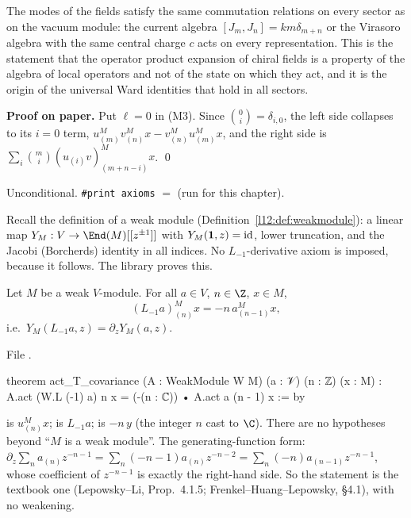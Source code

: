 \begin{physics}
The modes of the fields satisfy the same commutation relations on every sector as on the vacuum module: the
current algebra $[J_m,J_n] = km\delta_{m+n}$ or the Virasoro algebra with the same central charge $c$ acts on every
representation. This is the statement that the operator product expansion of chiral fields is a property of the algebra
of local operators and not of the state on which they act, and it is the origin of the universal Ward identities that
hold in all sectors.
\end{physics}

\textbf{Proof on paper.} Put $\ell = 0$ in (M3). Since $\binom0i = \delta_{i,0}$, the left side collapses to its $i=0$ term,
$u^M_{(m)}v^M_{(n)}x - v^M_{(n)}u^M_{(m)}x$, and the right side is $\sum_{i}\binom mi(u_{(i)}v)^M_{(m+n-i)}x$. \qed

\begin{status}
Unconditional. \texttt{\#print axioms}  $=$
\lean{[propext, Classical.}\allowbreak{}\allowbreak\lean{sound]} (run for this chapter).
\end{status}

Recall the definition of a weak module (Definition~\ref{l12:def:weakmodule}): a linear map
$Y_M:V\to\End(M)[[z^{\pm1}]]$ with $Y_M(\mathbf{1},z) = \mathrm{id}$, lower truncation, and the Jacobi
(Borcherds) identity in all indices. No $L_{-1}$-derivative axiom is imposed, because it follows. The
library proves this.

\begin{theorem}\label{l12:thm:covariance}
Let $M$ be a weak $V$-module. For all $a\in V$, $n\in\Z$, $x\in M$,
\begin{equation*}
 (L_{-1}a)^M_{(n)}x = -n\, a^M_{(n-1)}x ,
\end{equation*}
i.e.\ $Y_M(L_{-1}a,z) = \partial_z Y_M(a,z)$.
\end{theorem}
\noindent File .
\begin{leancode}
theorem act_T_covariance (A : WeakModule W M) (a : 𝒱) (n : ℤ) (x : M) :
    A.act (W.L (-1) a) n x = (-(n : ℂ)) • A.act a (n - 1) x := by
\end{leancode}

\begin{dictionary}
 is $u^M_{(n)}x$;  is $L_{-1}a$;  is $-n\,y$
(the integer $n$ cast to $\C$). There are no hypotheses beyond ``$M$ is a weak module''. The
generating-function form: $\partial_z\sum_n a_{(n)}z^{-n-1} = \sum_n(-n-1)a_{(n)}z^{-n-2}
= \sum_n (-n)a_{(n-1)}z^{-n-1}$, whose coefficient of $z^{-n-1}$ is exactly the right-hand side. So the
statement is the textbook one (Lepowsky--Li, Prop.~4.1.5; Frenkel--Huang--Lepowsky, §4.1), with no
weakening.
\end{dictionary}

